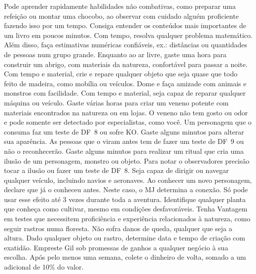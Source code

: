 \vfill
{}
{
	Pode aprender rapidamente habilidades não combativas, como preparar uma refeição ou montar uma chocobo, ao observar com cuidado alguém proficiente fazendo isso por um tempo. 
}
\newpage
{}
{
	Consiga entender os conteúdos mais importantes de um livro em poucos minutos.
}
\vfill
{}
{
	Com tempo, resolva qualquer problema matemático.
	Além disso, faça estimativas numéricas confiáveis, ex.: distâncias ou quantidades de pessoas num grupo grande.
}
\vfill
{}
{
	Enquanto ao ar livre, gaste uma hora para construir um abrigo, com materiais da natureza, confortável para passar a noite.
}	
\vfill
{}
{
	Com tempo e material, crie e repare qualquer objeto que seja quase que todo feito de madeira, como mobília ou veículos. 
}
\vfill
{}
{
	Dome e faça amizade com animais e monstros com facilidade.
}
\vfill
{}
{
	Com tempo e material, seja capaz de reparar qualquer máquina ou veículo. 
}
\vfill
{}
{
	Gaste várias horas para criar um veneno potente com materiais encontrados na natureza ou em lojas.
	O veneno não tem gosto ou odor e pode somente ser detectado por especialistas, como você.
	Um personagem que o consuma faz um teste de DF~8 ou sofre KO. 
}
\vfill
{}
{
	Gaste alguns minutos para alterar sua aparência.
	As pessoas que o viram antes tem de fazer um teste de DF~9 ou não o reconhecerão.
}
\vfill
{}
{
	Gaste alguns minutos para realizar um ritual que cria uma ilusão de um personagem, monstro ou objeto.
	Para notar o observadores precisão tocar a ilusão ou fazer um teste de DF~8.
}
\vfill
{}
{
	Seja capaz de dirigir ou navegar qualquer veículo, incluindo navios e aeronaves.
}
\vfill
{}
{
	Ao conhecer um novo personagem, declare que já o conheceu antes.
	Neste caso, o MJ determina a conexão.
	Só pode usar esse efeito até 3 vezes durante toda a aventura.
}
\vfill
{} 
{
	Identifique qualquer planta que conheça como cultivar, mesmo em condições desfavoráveis.
}
\vfill
{}
{
	Tenha Vantagem em testes que necessitem proficiência e experiência relacionados à natureza, como seguir rastros numa floresta.
}
%
\newpage
%
{
	Não sofra danos de queda, qualquer que seja a altura.
}
\vfill
{} 
{
	Dado qualquer objeto ou rastro, determine data e tempo de criação com exatidão.
}
\vfill
{}
{
	Empreste Gil sob promessas de ganhos a qualquer negócio à sua escolha.
	Após pelo menos uma semana, colete o dinheiro de volta, somado a um adicional de 10\% do valor.
}
